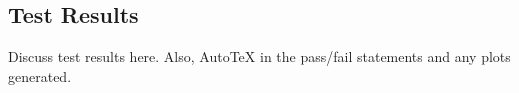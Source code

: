 \subsection{Test Results}

Discuss test results here. Also, AutoTeX in the pass/fail statements and any plots generated.